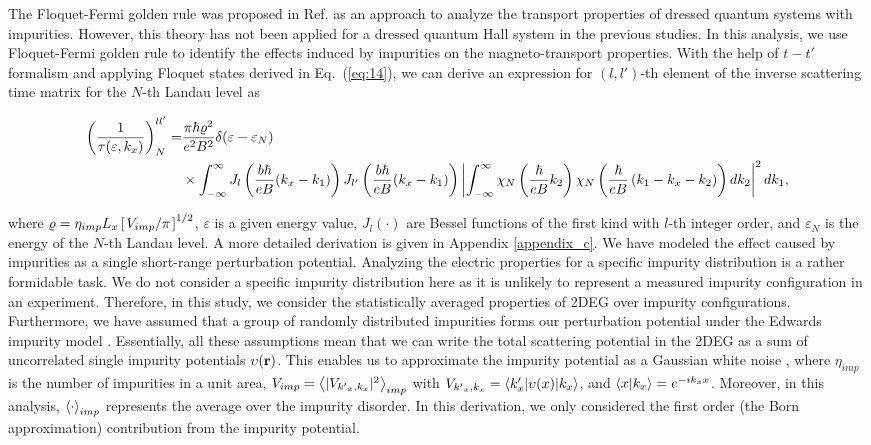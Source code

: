 \documentclass[
 reprint,
 amsmath,amssymb,
 aps,
 prb,
]{revtex4-2}
\begin{document}
The Floquet-Fermi golden rule was proposed in Ref. \cite{wackerl20} as an approach to analyze the transport properties of dressed quantum systems with impurities.
However, this theory has not been applied for a dressed quantum Hall system in the previous studies. In this analysis, we use Floquet-Fermi golden rule to identify the effects induced by impurities on the magneto-transport properties.
With the help of $t-t'$ formalism \cite{wackerl20,grifoni98,sambe75,peskin93,althorpe97} and applying Floquet states derived in Eq.~(\ref{eq:14}), we can derive an  expression for $(l,l')$-th element of the inverse scattering time matrix for the $N$-th Landau level as
\begin{widetext}
\begin{equation} \label{eq:15}
  \begin{aligned}
    \left(\frac{1}{\tau(\varepsilon,k_x)}\right)^{ll'}_N = &
    \frac{ \pi \hbar\varrho^2}{e^2B^2} \delta(\varepsilon - \varepsilon_N) \\
    & \times
    \int_{-\infty}^{\infty}
    J_l \bm{\left(} \frac{b\hbar}{eB}({k}_x - k_1) \bm{\right)}
    J_{l'} \bm{\left(} \frac{b\hbar}{eB}({k}_x - k_1) \bm{\right)}
    \left|
    \int_{-\infty}^{\infty}
    \chi_N \left( \frac{\hbar}{eB}k_2 \right)
    \chi_N \bm{\left(} \frac{\hbar}{eB}
    \left( k_1 - {k}_x - k_2 \right) \bm{\right)}
    dk_2 \right|^2 d k_1,
  \end{aligned}
\end{equation}
\end{widetext}
where $\varrho = \eta_{imp} L_x \left[\flatfrac{ V_{imp}}{\pi}\right]^{1/2}$, $\varepsilon$ is a given energy value, $J_l(\cdot)$ are Bessel functions of the first kind with $l$-th integer order, and $\varepsilon_N$ is the energy of the $N$-th Landau level.
A more detailed derivation is given in Appendix \ref{appendix_c}.
{\color{Red}
We have modeled the effect caused by impurities as a single short-range perturbation potential. Analyzing the electric properties for a specific impurity distribution is a rather formidable task. We do not consider a specific impurity distribution here as it is unlikely to represent a measured impurity configuration in an experiment.
Therefore, in this study, we consider the statistically averaged properties of 2DEG over impurity configurations.
Furthermore, we have assumed that a group of randomly distributed impurities forms our perturbation potential under the Edwards impurity model  \cite{akkermans10,wackerl20}.
Essentially, all these assumptions mean that we can write the total scattering potential in the 2DEG as a sum of uncorrelated single impurity potentials $\upsilon(\vb{r})$. This enables us to approximate the impurity potential as a Gaussian white noise \cite{akkermans10,wackerl20},
where $\eta_{imp}$ is the number of impurities in a unit area, $V_{imp} = \expval{|V_{{k'}_x,k_x}|^2}_{imp}$ with $V_{{k'}_x,k_x} = \mel**{k'_x}{\upsilon(x) }{k_x}$, and $\braket{x}{k_x} = e^{-ik_x x}$.
Moreover, in this analysis, $\expval{\cdot}_{imp}$ represents the average over the impurity disorder. In this derivation, we only considered the first order (the Born approximation) contribution from the impurity potential.
}
\end{document}
